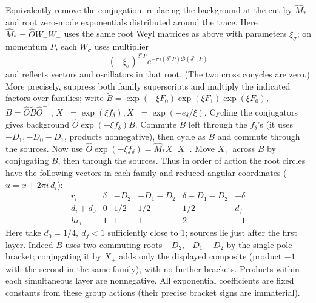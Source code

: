 \documentclass[11pt]{article}
\numberwithin{equation}{section}
\theoremstyle{definition}\newtheorem{definition}[theorem]{Definition}
\theoremstyle{remark}\newtheorem{remark}[theorem]{Remark}
\begin{document}
Equivalently remove the conjugation, replacing the background at the cut by \(\widehat M_*\) and root zero-mode exponentials distributed around the trace. Here \(\widehat M_*=\widehat O W_+W_-\) uses the same root Weyl matrices as above with parameters \(\xi_\sigma\); on momentum \(P\), each \(W_\sigma\) uses multiplier
\[
 (-\xi_\sigma)^{\delta^\sigma P} e^{-\pi i(\delta^\sigma P)\mathcal B(\delta^\sigma,P)}
\]
and reflects vectors and oscillators in that root. (The two cross cocycles are zero.) More precisely, suppress both family superscripts and multiply the indicated factors over families; write \(\widetilde B=\exp(-\xi F_0)\exp(\xi F_1)\exp(\xi F_0)\), \(B=\widehat O\widetilde B\widehat O^{-1}\), \(X_-=\exp(\xi f_\delta), X_+=\exp(-e_\delta/\xi)\). Cycling the conjugators gives background \(\widehat O\exp(-\xi f_\delta)\widetilde B\). Commute \(\widetilde B\) left through the \(f_\delta\)'s (it uses \(-D_1,-D_0-D_1\), products nonnegative), then cycle as \(B\) and commute through the sources. Now use \(\widehat O\exp(-\xi f_\delta)=\widehat M_* X_- X_+\). Move \(X_+\) across \(B\) by conjugating \(B\), then through the sources. Thus in order of action the root circles have the following vectors in each family and reduced angular coordinates (\(u=x+2\pi i\,d_i\)):
\begin{equation}
\begin{array}{c|ccccc}
 r_i&\delta&-D_2&-D_1-D_2&\delta-D_1-D_2&-\delta\\ \hline
 d_i+d_0&0&1/2&1/2&1/2&d_f\\
 h r_i&1&1&1&2&-1
\end{array}\label{L:eq3}
\end{equation}
Here take \(d_0=1/4,\ d_f<1\) sufficiently close to 1; sources lie just after the first layer. Indeed \(B\) uses two commuting roots \(-D_2,-D_1-D_2\) by the single-pole bracket; conjugating it by \(X_+\) adds only the displayed composite (product \(-1\) with the second in the same family), with no further brackets. Products within each simultaneous layer are nonnegative. All exponential coefficients are fixed constants from these group actions (their precise bracket signs are immaterial).
\end{document}
